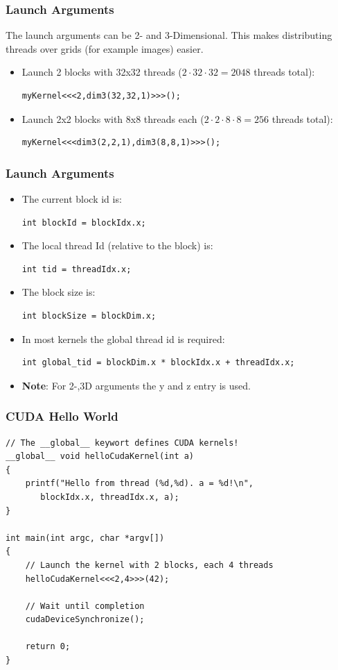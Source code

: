 \documentclass[aspectratio=169]{beamer}
\begin{document}
\begin{frame}[fragile]
	\frametitle{Launch Arguments}
	The launch arguments can be 2- and 3-Dimensional. This makes distributing threads over grids (for example images) easier.
	\begin{itemize}
		\item Launch 2 blocks with 32x32 threads ($2 \cdot 32 \cdot 32 = 2048$ threads total):
\begin{lstlisting}
myKernel<<<2,dim3(32,32,1)>>>();
\end{lstlisting}
		\item Launch 2x2 blocks with 8x8 threads each ($2\cdot 2 \cdot 8 \cdot 8 = 256$ threads total):
\begin{lstlisting}
myKernel<<<dim3(2,2,1),dim3(8,8,1)>>>();
\end{lstlisting}
	\end{itemize}
\end{frame}



\begin{frame}[fragile]
\frametitle{Launch Arguments}

\begin{itemize}
	\item The current block id is:
\begin{lstlisting}
int blockId = blockIdx.x;
\end{lstlisting}
	\item The local thread Id (relative to the block) is:
\begin{lstlisting}
int tid = threadIdx.x;
\end{lstlisting}
	\item The block size is:
\begin{lstlisting}
int blockSize = blockDim.x;
\end{lstlisting}	
	\item In most kernels the global thread id is required:
\begin{lstlisting}
int global_tid = blockDim.x * blockIdx.x + threadIdx.x;
\end{lstlisting}
	\item \textbf{Note}: For 2-,3D arguments the y and z entry is used.
\end{itemize}
\end{frame}


\begin{frame}[fragile]
\frametitle{CUDA Hello World}
\begin{lstlisting}
// The __global__ keywort defines CUDA kernels!
__global__ void helloCudaKernel(int a)
{
	printf("Hello from thread (%d,%d). a = %d!\n", 
	   blockIdx.x, threadIdx.x, a);
}

int main(int argc, char *argv[])
{
	// Launch the kernel with 2 blocks, each 4 threads
	helloCudaKernel<<<2,4>>>(42);
	
	// Wait until completion
	cudaDeviceSynchronize();
	
	return 0;
}
\end{lstlisting}
\end{frame}
\end{document}
